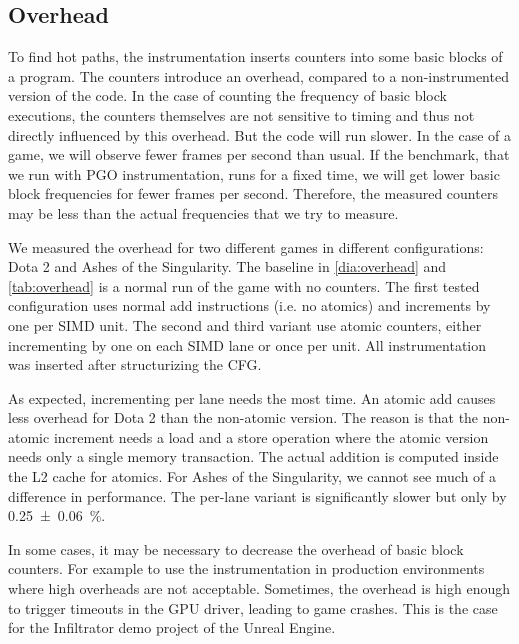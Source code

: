

\subsection{Overhead}
\label{sub:overhead}
To find hot paths, the instrumentation inserts counters into some basic blocks of a program. The counters introduce an overhead, compared to a non-instrumented version of the code.
In the case of counting the frequency of basic block executions, the counters themselves are not sensitive to timing and thus not directly influenced by this overhead.
But the code will run slower. In the case of a game, we will observe fewer frames per second than usual.
If the benchmark, that we run with PGO instrumentation, runs for a fixed time, we will get lower basic block frequencies for fewer frames per second.
Therefore, the measured counters may be less than the actual frequencies that we try to measure.

We measured the overhead for two different games in different configurations: Dota 2 and Ashes of the Singularity. The baseline in \cref{dia:overhead} and \cref{tab:overhead} is a normal run of the game with no counters.
The first tested configuration uses normal add instructions (i.e. no atomics) and increments by one per SIMD unit.
The second and third variant use atomic counters, either incrementing by one on each SIMD lane or once per unit.
All instrumentation was inserted after structurizing the CFG.

As expected, incrementing per lane needs the most time. An atomic add causes less overhead for Dota 2 than the non-atomic version.
The reason is that the non-atomic increment needs a load and a store operation where the atomic version needs only a single memory transaction. The actual addition is computed inside the L2 cache for atomics.
For Ashes of the Singularity, we cannot see much of a difference in performance. The per-lane variant is significantly slower but only by \SI{0.25 \pm 0.06}{\percent}.




\begin{table}
\centering
{}
\label{tab:overhead}
\end{table}


In some cases, it may be necessary to decrease the overhead of basic block counters. For example to use the instrumentation in production environments where high overheads are not acceptable.
Sometimes, the overhead is high enough to trigger timeouts in the GPU driver, leading to game crashes. This is the case for the Infiltrator demo project of the Unreal Engine.

